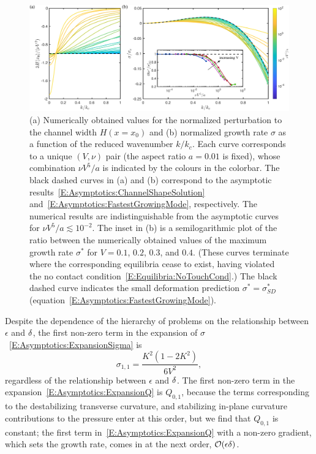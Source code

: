 \documentclass{jfm}
\begin{document}
\begin{figure}
\centering
\includegraphics[width = \textwidth]{figures/fig8_asymptotics.pdf}
\caption{(a) Numerically obtained values for the normalized perturbation to the channel width $H(x = x_0)$ and (b) normalized growth rate $\sigma$ as a function of the reduced wavenumber $k/k_c$. Each curve corresponds to a unique $(V,\nu)$ pair (the aspect ratio $a = 0.01$ is fixed), whose combination $\nu V^5 /a$ is indicated by the colours in the colorbar. The black dashed curves in (a) and (b) correspond to the asymptotic results~\eqref{E:Asymptotics:ChannelShapeSolution} and~\eqref{E:Asymptotics:FastestGrowingMode}, respectively. The numerical results are indistinguishable from the asymptotic curves for $\nu V^5 /a \lesssim 10^{-2}$. The inset in (b) is a semilogarithmic plot of the ratio between the numerically obtained values of the maximum growth rate $\sigma^*$ for $V = 0.1$, $0.2$, $0.3$, and $0.4$. (These curves terminate where the corresponding equilibria cease to exist, having violated the no contact condition~\eqref{E:Equilibria:NoTouchCond}.) The black dashed curve indicates the small deformation prediction $\sigma^* = \sigma^*_{SD}$ (equation~\eqref{E:Asymptotics:FastestGrowingMode}).}
\label{fig:CollapsedGrowthRates}
\end{figure}

Despite the dependence of the hierarchy of problems on the relationship between $\epsilon$ and $\delta$, the first non-zero term in the expansion of $\sigma$~\eqref{E:Asymptotics:ExpansionSigma} is
\begin{equation}\label{E:Asymptotics:LeadingOrderSigma}
\sigma_{1,1} = \frac{K^2\left(1-2K^2\right)}{6V^2},
\end{equation}
regardless of the relationship between $\epsilon$ and $\delta$. The first non-zero term in the expansion~\eqref{E:Asymptotics:ExpansionQ} is $Q_{0,1}$, because the terms corresponding to the destabilizing transverse curvature, and stabilizing in-plane curvature contributions to the pressure enter at this order, but we find that $Q_{0,1}$ is constant; the first term in~\eqref{E:Asymptotics:ExpansionQ} with a non-zero gradient, which sets the growth rate, comes in at the next order, $\mathcal{O}(\epsilon \delta)$.
\end{document}
